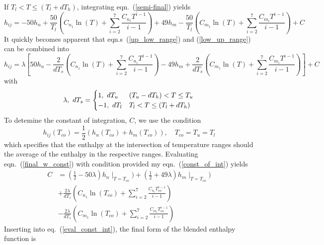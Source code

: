 \documentclass{article}   	%
\begin{document}
If $T_l < T \leq (T_l + dT_h)$, integrating eqn.~(\ref{semi-final}) yields
\begin{equation}
  h_{ij} = -50 h_n + \frac{50}{T_l}\left(C_{n_1}\ln(T) + \sum_{i=2}^{7} \frac{C_{n_i} T^{i-1}}{i-1} \right)
  +49 h_m - \frac{50}{T_l}\left(C_{m_1}\ln(T) + \sum_{i=2}^{7} \frac{C_{m_i} T^{i-1}}{i-1} \right) + C
  \label{low_up_range}
\end{equation}
It quickly becomes apparent that eqn.s~(\ref{up_low_range}) and (\ref{low_up_range}) can be combined into
\begin{equation}
  h_{ij} = \lambda\left[50 h_n - \frac{2}{dT_s}\left(C_{n_1}\ln(T) + \sum_{i=2}^{7} \frac{C_{n_i} T^{i-1}}{i-1} \right)
  -49 h_m + \frac{2}{dT_s}\left(C_{m_1}\ln(T) + \sum_{i=2}^{7} \frac{C_{m_i} T^{i-1}}{i-1} \right)\right] + C
  \label{final_w_const}
\end{equation}
with
\begin{equation}
  \lambda,\ dT_s = 
  \begin{cases}
    1,\ dT_u  &(T_u - dT_h) < T \leq T_u \\
    -1,\ dT_l &T_l < T \leq (T_l + dT_h)
  \end{cases} \\
\end{equation}
To detemine the constant of integration, $C$, we use the condition
\begin{equation}
  h_{ij}(T_{co}) = \frac{1}{2}(h_n(T_{co}) + h_m(T_{co})), \quad T_{co} = T_u = T_l
  \label{const_of_int}
\end{equation}
which specifies that the enthalpy at the intersection of temperature ranges
should the average of the enthalpy in the respective ranges.  Evaluating
eqn.~(\ref{final_w_const}) with condition provided my eqn.~(\ref{const_of_int}) yields
\begin{equation}
\begin{split}
  C &= (\frac{1}{2}-50\lambda)h_n\mid_{T=T_{co}}) + (\frac{1}{2}+49\lambda)h_m\mid_{T=T_{co}}) \\
  &+\frac{2\lambda}{dT_s}(C_{n_1}\ln(T_{co}) + \sum_{i=2}^{7} \frac{C_{n_i} T_{co}^{i-1}}{i-1}) \\
  &-\frac{2\lambda}{dT_s}(C_{m_1}\ln(T_{co}) + \sum_{i=2}^{7} \frac{C_{m_i} T_{co}^{i-1}}{i-1})
  \label{eval_const_int}
\end{split}
\end{equation}
Inserting into eq.~(\ref{eval_const_int}), the final form of the blended enthalpy function is
\end{document}
